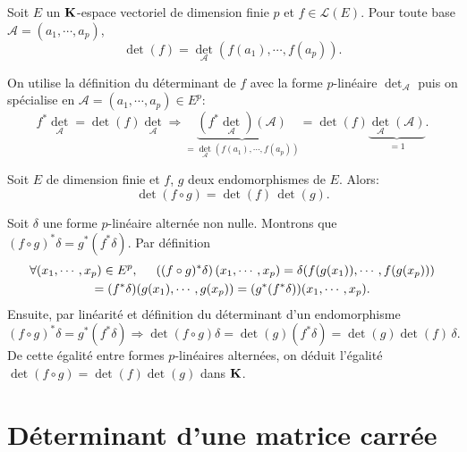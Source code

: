 \newpage
\begin{propn}
 Soit $E$ un $\mathbf{K}$-espace vectoriel de dimension finie $p$ et $f \in \mathcal{L}(E)$. Pour toute base $\mathcal{A}=(a_1,\cdots,a_p)$,
\begin{displaymath}
 \det(f) = \det_{\mathcal{A}}(f(a_1),\cdots,f(a_p)).
\end{displaymath}
\end{propn}
\begin{demo}
On utilise la définition du déterminant de $f$ avec la forme $p$-linéaire $\det_\mathcal{A}$ puis on spécialise en $\mathcal{A}=(a_1,\cdots,a_p)\in E^p$:
\[
  f^*\det_\mathcal{A} = \det(f) \det_\mathcal{A} \Rightarrow 
  \underset{= \det_\mathcal{A}(f(a_1), \cdots, f(a_p))}{\underbrace{(f^*\det_\mathcal{A})(\mathcal{A})}} 
  = \det(f) \underset{ = 1}{\underbrace{\det_\mathcal{A}(\mathcal{A})}}.
\]
\end{demo}
\newpage
{}
\begin{propn}
 Soit $E$ de dimension finie et $f$, $g$ deux endomorphismes de $E$. Alors: 
\begin{displaymath}
 \det(f\circ g) = \det(f)\, \det(g).
\end{displaymath}
\end{propn}
\begin{demo}
 Soit $\delta$ une forme $p$-linéaire alternée non nulle. Montrons que $(f\circ g)^*\delta = g^*(f^*\delta)$. Par définition
\begin{multline*}
  \forall (x_1, \cdots, x_p) \in E^p, \hspace{0.5cm}
  \left((f\circ g)^*\delta\right)(x_1, \cdots, x_p)=\delta(f(g(x_1)), \cdots, f(g(x_p)))\\
  = (f^*\delta)(g(x_1), \cdots, g(x_p))
  = (g^*(f^*\delta))(x_1, \cdots ,x_p).
\end{multline*}
Ensuite, par linéarité et définition du déterminant d'un endomorphisme
\[
  (f\circ g)^*\delta = g^*(f^*\delta)
  \Rightarrow
  \det(f \circ g) \delta = \det(g) (f^*\delta) = \det(g) \det(f) \, \delta .
\]
De cette égalité entre formes $p$-linéaires alternées, on déduit l'égalité $\det(f\circ g) = \det(f) \det(g)$ dans $\mathbf{K}$.
\end{demo}
\clearpage
\section{Déterminant d'une matrice carrée}

